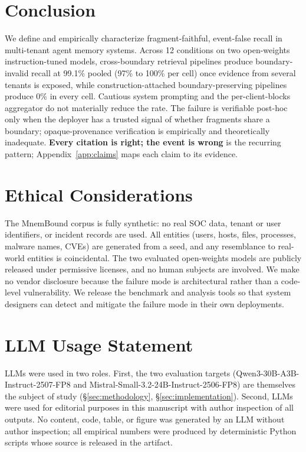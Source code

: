 \documentclass[conference,compsoc]{IEEEtran}
\begin{document}
\section{Conclusion}\label{sec:conclusion}

We define and empirically characterize fragment-faithful, event-false recall in multi-tenant agent memory systems. Across 12 conditions on two open-weights instruction-tuned models, cross-boundary retrieval pipelines produce boundary-invalid recall at 99.1\% pooled (97\% to 100\% per cell) once evidence from several tenants is exposed, while construction-attached boundary-preserving pipelines produce 0\% in every cell. Cautious system prompting and the per-client-blocks aggregator do not materially reduce the rate. The failure is verifiable post-hoc only when the deployer has a trusted signal of whether fragments share a boundary; opaque-provenance verification is empirically and theoretically inadequate. \textbf{Every citation is right; the event is wrong} is the recurring pattern; Appendix~\ref{app:claims} maps each claim to its evidence.

\section*{Ethical Considerations}

The MnemBound corpus is fully synthetic: no real SOC data, tenant or user identifiers, or incident records are used. All entities (users, hosts, files, processes, malware names, CVEs) are generated from a seed, and any resemblance to real-world entities is coincidental. The two evaluated open-weights models are publicly released under permissive licenses, and no human subjects are involved. We make no vendor disclosure because the failure mode is architectural rather than a code-level vulnerability. We release the benchmark and analysis tools so that system designers can detect and mitigate the failure mode in their own deployments.

\section*{LLM Usage Statement}

LLMs were used in two roles. First, the two evaluation targets (Qwen3-30B-A3B-Instruct-2507-FP8 and Mistral-Small-3.2-24B-Instruct-2506-FP8) are themselves the subject of study (\S\ref{sec:methodology}, \S\ref{sec:implementation}). Second, LLMs were used for editorial purposes in this manuscript with author inspection of all outputs. No content, code, table, or figure was generated by an LLM without author inspection; all empirical numbers were produced by deterministic Python scripts whose source is released in the artifact.
\end{document}
